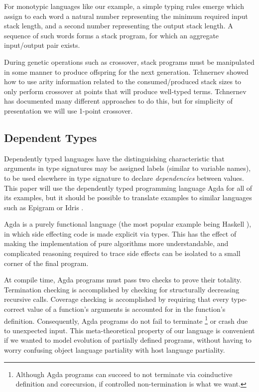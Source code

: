 \documentclass{acm_proc_article-sp}
\begin{document}
For monotypic languages like our example, a simple typing rules
emerge which assign to each word a natural number representing the
minimum required input stack length, and a second number representing
the output stack length. A sequence of such words forms a stack
program, for which an aggregate input/output pair exists.

During genetic operations such as crossover, stack programs must be
manipulated in some manner to produce offspring for the next
generation. Tchnernev \cite{tchernev:forthcross} showed how to use arity
information related to the consumed/produced stack sizes to only
perform crossover at points that will produce well-typed
terms. Tchnernev \cite{tchernev:crossmethods} has documented many different
approaches to do this, but for simplicity of presentation we will use
1-point crossover.

\subsection{Dependent Types}

Dependently typed languages have the distinguishing characteristic
that arguments in type signatures may be assigned labels (similar to
variable names), to be used elsewhere in type signature to declare
\textit{dependencies} between values. This paper will use the
dependently typed programming language Agda \cite{norell:agdatut} for
all of its examples, but it should be possible to translate examples
to similar languages such as Epigram \cite{mcbride:epigram} or
Idris \cite{brady:idris}.

Agda is a purely functional language (the most popular example being
Haskell \cite{spj:haskell}), in which side effecting code is made explicit via
types. This has the effect of making the implementation of pure algorithms
more understandable, and complicated reasoning required to trace side
effects can be isolated to a small corner of the final program.

At compile time, Agda programs must pass two checks to prove their
totality. Termination checking is accomplished by checking
for structurally decreasing recursive calls. Coverage checking is
accomplished by requiring that every type-correct value of a function's
arguments is accounted for in the function's definition.
Consequently, Agda programs do not fail to terminate
\footnote{Although Agda programs can succeed to not terminate via
  coinductive definition and corecursion, if controlled
  non-termination is what we want.}
or crash due to unexpected input. This meta-theoretical property of
our language is convenient if we wanted to model evolution of
partially defined programs, without having to worry confusing object
language partiality with host language partiality.
\end{document}
